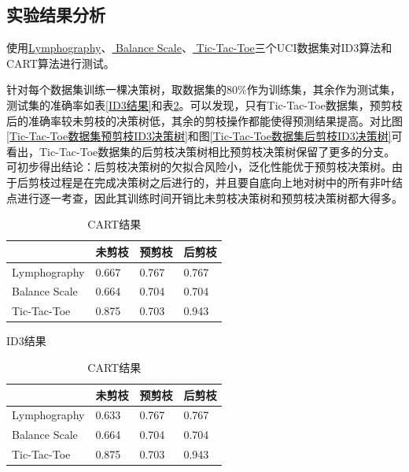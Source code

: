 \documentclass{ctexart}
\begin{document}
	\subsection{实验结果分析}
	
	使用\href{https://archive.ics.uci.edu/ml/datasets/Lymphography}{Lymphography}、\href{https://archive.ics.uci.edu/ml/datasets/balance+scale}{
		Balance Scale}、\href{https://archive.ics.uci.edu/ml/datasets/Tic-Tac-Toe+Endgame}{
		Tic-Tac-Toe}三个UCI数据集对ID3算法和CART算法进行测试。
	
	针对每个数据集训练一棵决策树，取数据集的80\%作为训练集，其余作为测试集，测试集的准确率如表\ref{ID3结果}和表\ref{CART结果}。可以发现，只有Tic-Tac-Toe数据集，预剪枝后的准确率较未剪枝的决策树低，其余的剪枝操作都能使得预测结果提高。对比图\ref{Tic-Tac-Toe数据集预剪枝ID3决策树}和图\ref{Tic-Tac-Toe数据集后剪枝ID3决策树}可看出，Tic-Tac-Toe数据集的后剪枝决策树相比预剪枝决策树保留了更多的分支。可初步得出结论：后剪枝决策树的欠拟合风险小，泛化性能优于预剪枝决策树。由于后剪枝过程是在完成决策树之后进行的，并且要自底向上地对树中的所有非叶结点进行逐一考查，因此其训练时间开销比未剪枝决策树和预剪枝决策树都大得多。
	
	\begin{table}[!htb]
		\begin{minipage}[b]{.46\textwidth}
			\centering
			\begin{tabular}{l|l|l|l}
				\hline
				& 未剪枝   & 预剪枝   & 后剪枝   \\
				\hline
				Lymphography        & 0.667 & 0.767 & 0.767 \\
				\hline
				Balance Scale       & 0.664 & 0.704 & 0.704 \\
				\hline
				Tic-Tac-Toe & 0.875 & 0.703 & 0.943 \\   
				\hline
			\end{tabular}
			\caption{ID3结果}
			\label{ID3结果}
		\end{minipage}
		\hfill
		\begin{minipage}[b]{.46\textwidth}
			\centering
			\begin{tabular}{l|l|l|l}
				\hline
				& 未剪枝   & 预剪枝   & 后剪枝   \\
				\hline
				Lymphography &0.633 &0.767 &0.767 \\
				\hline
				Balance Scale & 0.664&0.704 & 0.704 \\
				\hline
				Tic-Tac-Toe &0.875&0.703 & 0.943\\   
				\hline
			\end{tabular}
			\caption{CART结果}
			\label{CART结果}
		\end{minipage}
	\end{table}
\end{document}
